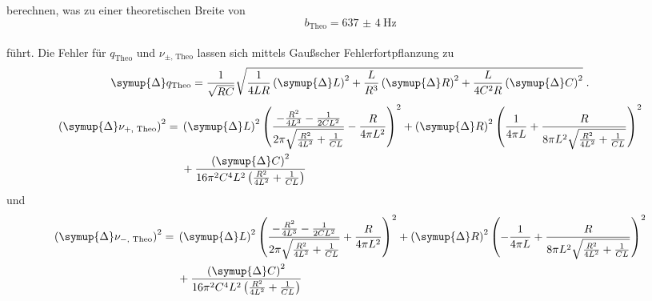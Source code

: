 berechnen, was zu einer theoretischen Breite von 
\begin{equation*}
    b_\text{Theo} = \SI{637(4)}{\hertz}
\end{equation*}\\
führt. 
Die Fehler für $q_\text{Theo}$ und $\nu_{\pm\text{, Theo}}$ lassen sich mittels Gaußscher Fehlerfortpflanzung zu
\begin{equation}
    \symup{\Delta} q_\text{Theo} = \frac{1}{\sqrt{RC}} \sqrt{\frac{1}{4LR} \left ( \symup{\Delta} L \right )^2 + \frac{L}{R^3} \left ( \symup{\Delta} R \right )^2 
    + \frac{L}{4C^2R} \left ( \symup{\Delta} C \right )^2} \; \text{.}
\end{equation}
\begin{equation}
    \begin{split}
    \left ( \symup{\Delta} \nu_{+\text{, Theo}} \right )^2= {} & \left ( \symup{\Delta} L \right)^{2} \left(\frac{- \frac{R^{2}}{4 L^{3}} - \frac{1}{2 C L^{2}}}{2 \pi \sqrt{\frac{R^{2}}{4 L^{2}} + \frac{1}{C L}}} - \frac{R}{4 \pi L^{2}}\right)^{2} + \left ( \symup{\Delta} R \right)^{2} \left(\frac{1}{4 \pi L} + \frac{R}{8 \pi L^{2} \sqrt{\frac{R^{2}}{4 L^{2}} + \frac{1}{C L}}}\right)^{2} \\
    & + \frac{\left ( \symup{\Delta} C \right)^{2}}{16 \pi^{2} C^{4} L^{2} \left(\frac{R^{2}}{4L^{2}} + \frac{1}{C L}\right)}
    \end{split}
\end{equation}
und 
\begin{equation}
    \begin{split}
    \left ( \symup{\Delta} \nu_{-\text{, Theo}} \right )^2= {} & \left ( \symup{\Delta} L \right)^{2} \left(\frac{- \frac{R^{2}}{4 L^{3}} - \frac{1}{2 C L^{2}}}{2 \pi \sqrt{\frac{R^{2}}{4 L^{2}} + \frac{1}{C L}}} + \frac{R}{4 \pi L^{2}}\right)^{2} + \left ( \symup{\Delta} R \right)^{2} \left(- \frac{1}{4 \pi L} + \frac{R}{8 \pi L^{2} \sqrt{\frac{R^{2}}{4 L^{2}} + \frac{1}{C L}}}\right)^{2} \\
    & + \frac{\left ( \symup{\Delta} C \right)^{2}}{16 \pi^{2} C^{4} L^{2} \left(\frac{R^{2}}{4 L^{2}} + \frac{1}{C L}\right)}
    \end{split}
\end{equation}